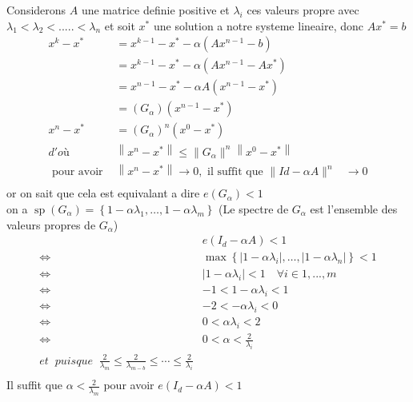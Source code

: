 \documentclass[12pt]{report}
\begin{document}
Considerons $A$ une matrice definie positive et $\lambda_{i}$ ces valeurs propre avec \\  $\lambda_{1}<\lambda_{2}< .....<\lambda_{n}$
et soit $x^{*}$ une solution a notre systeme lineaire, donc $Ax^{*}=b$
$$
\begin{aligned}
x^{k}-x^{*} &=x^{k-1}-x^{*}-\alpha\left(A x^{n-1}-b\right) \\
&=x^{k-1}-x^{*}-\alpha\left(A x^{n-1}-A x^{*}\right) \\
&=x^{n-1}-x^{*}-\alpha A\left(x^{n-1}-x^{*}\right) \\
&=(G_{\alpha})\left(x^{n-1}-x^{*}\right) \\
x^{n}-x^{*} &=(G_{\alpha})^{n}\left(x^{0}-x^{*}\right) \\
{d'où \;\;} &\left\|x^{n}-x^{*}\right\| \leqslant\|G_{\alpha}\|^{n}\left\|x^{0}-x^{*}\right\|\\
\text { pour avoir } &\left\|x^{n}-x^{*}\right\|\rightarrow 0, \text { il suffit que } 
\|I d-\alpha A\|^{n} & \rightarrow 0 \\
\end{aligned}
$$
or on sait que cela est equivalant a dire $e(G_{\alpha}) < 1$\\

on a $\operatorname{sp}(G_{\alpha})=\left\{1-\alpha \lambda_{1}, \ldots, 1-\alpha \lambda_{m}\right\} $
(Le spectre de $G_{\alpha}$ est l'ensemble des valeurs propres de $G_{\alpha}$)
$$
\begin{aligned}
&e(I_{d}-\alpha A)<1\\
\Leftrightarrow & \max \left\{\left|1-\alpha \lambda_{i}\right|, \ldots,\left|1-\alpha \lambda_{n}\right|\right\}<1 \\
\Leftrightarrow &\left|1-\alpha \lambda_{i}\right|<1 \quad \forall i \in 1,... ,m\\
\Leftrightarrow &-1<1-\alpha \lambda_{i}<1 \\
\Leftrightarrow &-2<-\alpha \lambda_{i}<0 \\
\Leftrightarrow & 0<\alpha \lambda_{i}<2 \\
\Leftrightarrow & 0<\alpha<\frac{2}{\lambda_{i}} \\
{et \;\; puisque \;\;}\frac{2}{\lambda_{m}} \leqslant \frac{2}{\lambda_{m-b}} \leqslant \cdots \leqslant \frac{2}{\lambda_{i}} \\
\end{aligned}
$$
Il suffit que  $\alpha<\frac{2}{\lambda_{m}}$ pour avoir $e\left(I_{d}-\alpha A\right)<1$\\
\end{document}
